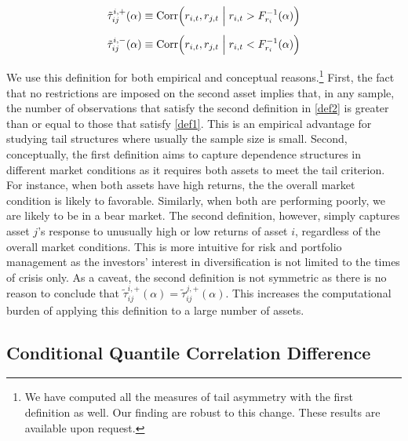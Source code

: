 \documentclass{article}
\begin{document}
\vspace{-2mm}
\begin{equation}\label{def2}
\begin{split}
\tilde{\tau}^{i,+}_{ij}(\alpha) &\equiv \text{Corr}\Big(r_{i,t}, r_{j,t} \hspace{1mm} \Big| \hspace{1mm} r_{i,t} > F^{-1}_{r_{i}}(\alpha) \Big)  \\[1.5mm]
\tilde{\tau}^{i,-}_{ij}(\alpha) &\equiv \text{Corr}\Big(r_{i,t}, r_{j,t} \hspace{1mm} \Big| \hspace{1mm} r_{i,t} < F^{-1}_{r_{i}}(\alpha)\Big)  
\end{split}
\end{equation}

We use this definition for both empirical and conceptual reasons.\footnote{We have computed all the measures of tail asymmetry with the first definition as well. Our finding are robust to this change. These results are available upon request.} First, the fact that no restrictions are imposed on the second asset implies that, in any sample, the number of observations that satisfy the second definition in \ref{def2} is greater than or equal to those that satisfy \ref{def1}. This is an empirical advantage for studying tail structures where usually the sample size is small. Second, conceptually, the first definition aims to capture dependence structures in different market conditions as it requires both assets to meet the tail criterion. For instance, when both assets have high returns, the the overall market condition is likely to favorable. Similarly, when both are performing poorly, we are likely to be in a bear market. The second definition, however, simply captures asset $j$'s response to unusually high or low returns of asset $i$, regardless of the overall market conditions. This is more intuitive for risk and portfolio management as the investors' interest in diversification is not limited to the times of crisis only. As a caveat, the second definition is not symmetric as there is no reason to conclude that $\tilde{\tau}^{i,+}_{ij}(\alpha) = \tilde{\tau}^{j,+}_{ij}(\alpha)$. This increases the computational burden of applying this definition to a large number of assets. 


\subsection{Conditional Quantile Correlation Difference}\label{sec:cqcd}
\end{document}
